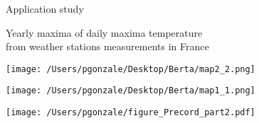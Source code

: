 \documentclass[9pt,compress]{beamer}
\begin{document}
%
%
%
\begin{frame}{Application study}
\begin{center}
\LARGE {\color{beamer@blendedblue}Yearly maxima of daily maxima temperature \\
from weather stations measurements in France}
\end{center}
\end{frame}
%
%
%
\begin{frame}%
\begin{center}
\texttt{[image: /Users/pgonzale/Desktop/Berta/map2\_2.png]}
  \end{center}    
\end{frame}
%
%
%
\begin{frame}%
\begin{center}
\texttt{[image: /Users/pgonzale/Desktop/Berta/map1\_1.png]}
  \end{center}    
\end{frame}
%
%
%
\begin{frame}%
\begin{center}
\texttt{[image: /Users/pgonzale/figure\_Precord\_part2.pdf]}
  \end{center}    
\end{frame}
\end{document}
